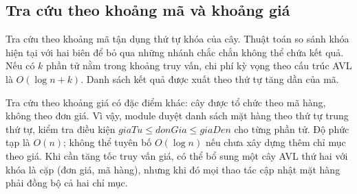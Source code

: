 \subsection{Tra cứu theo khoảng mã và khoảng giá}
Tra cứu theo khoảng mã tận dụng thứ tự khóa của cây. Thuật toán so sánh khóa hiện tại với hai biên để bỏ qua những nhánh chắc chắn không thể chứa kết quả. Nếu có $k$ phần tử nằm trong khoảng truy vấn, chi phí kỳ vọng theo cấu trúc AVL là $O(\log n+k)$. Danh sách kết quả được xuất theo thứ tự tăng dần của mã.

Tra cứu theo khoảng giá có đặc điểm khác: cây được tổ chức theo mã hàng, không theo đơn giá. Vì vậy, module duyệt danh sách mặt hàng theo thứ tự trung thứ tự, kiểm tra điều kiện $giaTu \le donGia \le giaDen$ cho từng phần tử. Độ phức tạp là $O(n)$; không thể tuyên bố $O(\log n)$ nếu chưa xây dựng thêm chỉ mục theo giá. Khi cần tăng tốc truy vấn giá, có thể bổ sung một cây AVL thứ hai với khóa là cặp (đơn giá, mã hàng), nhưng khi đó mọi thao tác cập nhật mặt hàng phải đồng bộ cả hai chỉ mục.

